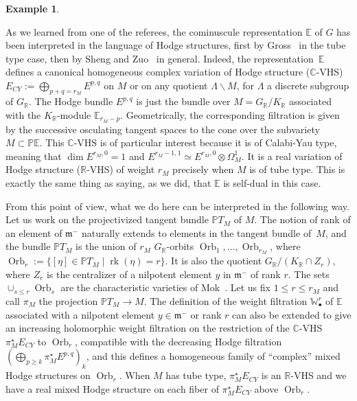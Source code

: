 \documentclass[JEP,XML,SOM,Unicode,NoFloatCountersInSection]{cedram}
\newcommand{\sbullet}{{\scriptscriptstyle\bullet}}
\theoremstyle{plain}
\theoremstyle{definition}
\newtheorem{exem}[theo]{Example}
\let\rgy r
\DeclareMathOperator{\Orb}{Orb}
\DeclareMathOperator{\rk}{rk}
\newcommand{\bC}{\mathbb{C}}
\newcommand{\bE}{\mathbb{E}}
\newcommand{\bP}{\mathbb{P}}
\newcommand{\bR}{\mathbb{R}}
\newcommand{\bPTM}{{\mathbb{P}T_M}}
\newcommand{\Wr}{\mathbb{W}^\rgy}
\newcommand{\fm}{\mathfrak{m}}
\newcommand{\rkm}{{r_M}}
\begin{document}
\begin{exem}
\label{subsec:hodge}

As we learned from one of the referees, the cominuscule
representation $\bE$ of $G$ has been interpreted in the language of Hodge structures,
first by Gross~\cite{Gross} in the tube type case, then by Sheng and Zuo~\cite{ShengZuo} in
general. Indeed, the representation~$\bE$ defines a canonical homogeneous complex variation of
Hodge structure ($\bC$-VHS) $E_{CY}:=\bigoplus_{p+q=\rkm} E^{p,q}$ on $M$ or on any quotient
$\Lambda\backslash M$, for $\Lambda$ a discrete
subgroup of $G_\bR$. The Hodge bundle $E^{p,q}$ is just the bundle over $M=G_\bR/K_\bR$ associated
with the $K_\bR$-module $\bE_{\rkm-p}$.
Geometrically, the corresponding filtration is given by the successive osculating tangent spaces
to the cone over the subvariety $M \subset \bP
\bE$.
This $\bC$-VHS is of particular interest because it is of
Calabi-Yau type, meaning that $\dim
E^{\rkm,0}=1$ and $E^{\rkm-1,1}\simeq E^{\rkm,0}\otimes \Omega^1_M$. It is a real variation of
Hodge structure ($\bR$-VHS) of weight $\rkm$ precisely when $M$ is of tube type. This is exactly
the same thing as saying, as we did, that $\bE$ is self-dual in this case.

From this point of view, what we do here can be interpreted in the following way. Let us work
on the projectivized tangent bundle $\bPTM$ of $M$. The notion of rank of an element of $\fm^-$
naturally extends to elements in the tangent bundle of~$M$, and the bundle $\bPTM$ is the union
of $\rkm$ $G_\bR$-orbits ${\Orb}_1,\ldots,{\Orb}_\rkm$, where
\hbox{${\Orb}_r:=\{[\eta]\in\bPTM\mid \rk(\eta)=r\}$}. It is also the quotient
$G_\bR/(K_\bR \cap Z_r)$, where $Z_r$ is the centralizer of a nilpotent element $y$ in $\fm^-$ of rank
$r$.
The sets $\cup_{s\leq r}{\Orb}_s$ are the characteristic varieties of
Mok~\cite{Mok}. Let us fix $1\leq r\leq \rkm$ and call $\pi_M$ the projection $\bPTM\to M$.
The definition of the weight filtration $\Wr_\sbullet$ of $\bE$ associated with a nilpotent
element $y\in\fm^-$ or rank $r$ can also be extended to give an increasing holomorphic weight filtration on the
restriction of the $\bC$-VHS $\pi_M^\star E_{CY}$ to $\Orb_r$, compatible with the decreasing
Hodge filtration
$(\bigoplus_{p\geq k}\pi_M^\star E^{p,q})_k$, and this defines a homogeneous family of
``complex'' mixed Hodge structures on ${\Orb}_r$. When $M$ has tube type, $\pi_M^\star E_{CY}$
is an $\bR$-VHS and we have a real mixed Hodge structure on each fiber of $\pi_M^\star
E_{CY}$ above ${\Orb}_r$.


\end{exem}
\end{document}
